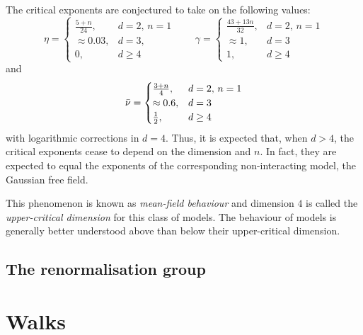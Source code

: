 The critical exponents are conjectured to take on the following values:
\begin{equation}
\eta =
	\begin{cases}
	\frac{5 + n}{24},		& d = 2, \, n = 1 \\
	\approx 0.03,			& d = 3, \\
	0,						& d \ge 4
	\end{cases}
\qquad
\gamma =
	\begin{cases}
	\frac{43 + 13 n}{32},	& d = 2, \, n = 1 \\
	\approx 1,				& d = 3 \\
	1,						& d \ge 4
	\end{cases}
\end{equation}
and
\begin{equation}
\bar\nu =
	\begin{cases}
	\frac{3 + n}{4},		& d = 2, \, n = 1 \\
	\approx 0.6,			& d = 3 \\
	\frac{1}{2},			& d \ge 4
	\end{cases}
\end{equation}
with logarithmic corrections in $d = 4$.
Thus, it is expected that, when $d > 4$, the critical exponents cease to depend
on the dimension and $n$. In fact, they are expected to equal the exponents of
the corresponding non-interacting model, the Gaussian free field.

This phenomenon is known as \emph{mean-field behaviour} and dimension $4$ is
called the \emph{upper-critical dimension} for this class of models. The behaviour
of models is generally better understood above than below their upper-critical
dimension.


\subsection{The renormalisation group}



\section{Walks}

